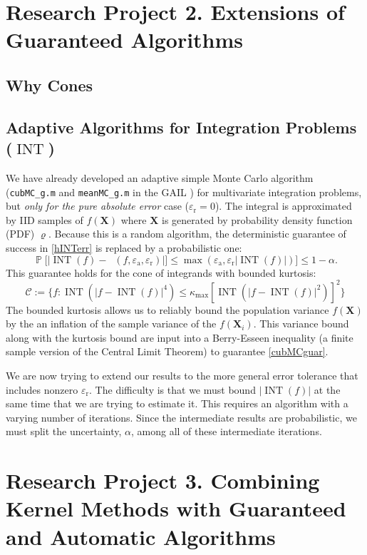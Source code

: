 \documentclass[11pt]{NSFamsart}
\DeclareMathOperator{\INT}{INT}
\DeclareMathOperator{\hINT}{\widehat{\INT}}
\newcommand{\bX}{{\boldsymbol{X}}}
\newcommand{\calc}{{\mathcal{C}}}
\DeclareMathOperator{\Prob}{\mathbb{P}}
\def\abs#1{\ensuremath{\left \lvert #1 \right \rvert}}
\newcommand{\bigabs}[1]{\ensuremath{\bigl \lvert #1 \bigr \rvert}}
\newcommand{\abstol}{\varepsilon_{\text{a}}}
\newcommand{\reltol}{\varepsilon_{\text{r}}}
\begin{document}
\section*{Research Project 2. Extensions of Guaranteed Algorithms}\label{SectGAIL}
\subsection*{Why Cones}
\subsection*{Adaptive Algorithms for Integration Problems ($\INT$)}  We have already developed an adaptive simple Monte Carlo algorithm \citep{HicEtal14b} (\texttt{cubMC\_g.m} and \texttt{meanMC\_g.m} in the GAIL \citep{ChoEtal14a}) for multivariate integration problems, but \emph{only for the pure absolute error} case ($\reltol=0$).  The integral is approximated by IID samples of $f(\bX)$ where $\bX$ is generated by probability density function (PDF) $\varrho$. Because this is a random algorithm, the deterministic guarantee of success in \eqref{hINTerr} is replaced by a probabilistic one:
\begin{equation} \label{cubMCguar}
 \Prob\bigl[\bigabs{\INT(f) -\hINT(f,\abstol,\reltol)} \bigr ] \le \max(\abstol,\reltol \abs{\INT(f)}) \bigr] \le 1-\alpha.
\end{equation}
This guarantee holds for the cone of integrands with bounded kurtosis:
\begin{equation}
\calc := \bigl \{ f : \INT(\abs{f - \INT(f)}^4) \le \kappa_{\max} [\INT(\abs{f - \INT(f)}^2)]^2 \bigr\}
\end{equation}
The bounded kurtosis allows us to reliably bound the population variance $f(\bX)$ by the an inflation of the sample variance of the $f(\bX_i)$. This variance bound along with the kurtosis bound are input into a Berry-Esseen inequality (a finite sample version of the Central Limit Theorem) to guarantee \eqref{cubMCguar}.

We are now trying to extend our results to the more general error tolerance that includes nonzero $\reltol$.  The difficulty is that we must bound $\abs{\INT(f)}$ at the same time that we are trying to estimate it.  This requires an algorithm with a varying number of iterations.  Since the intermediate results are probabilistic, we must split the uncertainty, $\alpha$, among all of these intermediate iterations.



\section*{Research Project 3. Combining Kernel Methods with Guaranteed and Automatic Algorithms} \label{combinesec}
\end{document}
